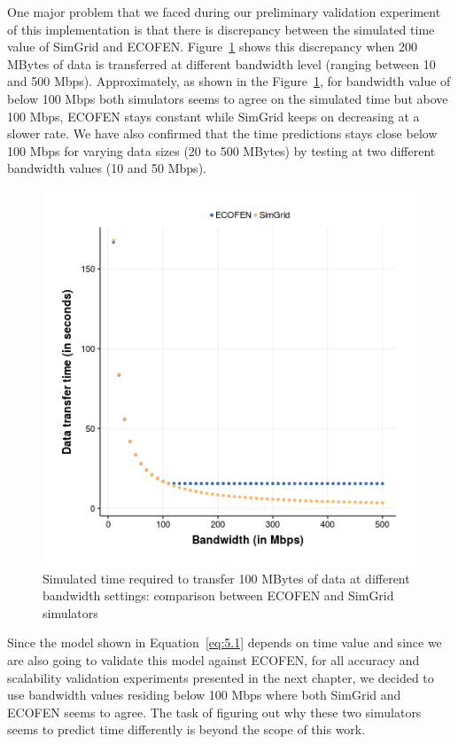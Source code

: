One major problem that we faced during our preliminary validation experiment of this implementation is that there is discrepancy between the simulated time value of SimGrid and ECOFEN. Figure~\ref{fig:bandwidthvstime} shows this discrepancy when 200 MBytes of data is transferred at different bandwidth level (ranging between 10 and 500 Mbps). Approximately, as shown in the Figure~\ref{fig:bandwidthvstime}, for bandwidth value of below 100 Mbps both simulators seems to agree on the simulated time but above 100 Mbps, ECOFEN stays constant while SimGrid keeps on decreasing at a slower rate. We have also confirmed that the time predictions stays close below 100 Mbps for varying data sizes (20 to 500 MBytes) by testing at two different bandwidth values (10 and 50 Mbps).

\begin{figure}[ht]
	\begin{center}
		\includegraphics[width=14cm]{images/ex18_bw_time_sg_vs_ns3}
		\caption{Simulated time required to transfer 100 MBytes of data at different bandwidth settings: comparison between ECOFEN and SimGrid simulators}
		\label{fig:bandwidthvstime}
	\end{center}
\end{figure}

Since the model shown in Equation~\ref{eq:5.1} depends on time value and since we are also going to validate this model against ECOFEN, for all accuracy and scalability validation experiments presented in the next chapter, we decided to use bandwidth values residing below 100 Mbps where both SimGrid and ECOFEN seems to agree. The task of figuring out why these two simulators seems to predict time differently is beyond the scope of this work. 

